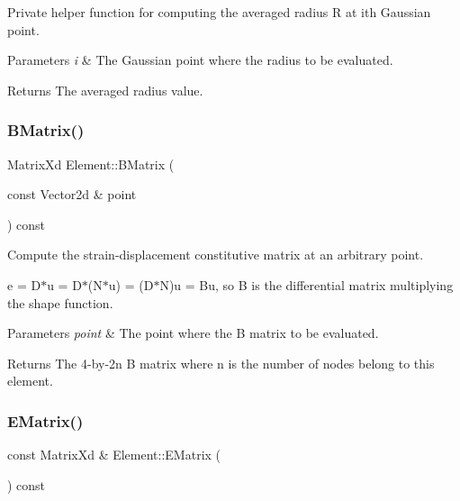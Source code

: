 Private helper function for computing the averaged radius R at ith Gaussian point. 


\begin{DoxyParams}{Parameters}
{\em i} & The Gaussian point where the radius to be evaluated. \\
\hline
\end{DoxyParams}
\begin{DoxyReturn}{Returns}
The averaged radius value. 
\end{DoxyReturn}
\mbox{\label{class_element_a19f8ba5c4c7569c3bcccf1b422a7dd89}} 
\subsubsection{\texorpdfstring{B\+Matrix()}{BMatrix()}}
{\footnotesize\ttfamily Matrix\+Xd Element\+::\+B\+Matrix (\begin{DoxyParamCaption}\item[{const Vector2d \&}]{point }\end{DoxyParamCaption}) const}



Compute the strain-\/displacement constitutive matrix at an arbitrary point. 

e = D$\ast$u = D$\ast$(N$\ast$u) = (D$\ast$N)u = Bu, so B is the differential matrix multiplying the shape function.


\begin{DoxyParams}{Parameters}
{\em point} & The point where the B matrix to be evaluated. \\
\hline
\end{DoxyParams}
\begin{DoxyReturn}{Returns}
The 4-\/by-\/2n B matrix where n is the number of nodes belong to this element. 
\end{DoxyReturn}
\mbox{\label{class_element_abd9d11d211f4f5e6f9e213a1013f36ed}} 
\subsubsection{\texorpdfstring{E\+Matrix()}{EMatrix()}}
{\footnotesize\ttfamily const Matrix\+Xd \& Element\+::\+E\+Matrix (\begin{DoxyParamCaption}{ }\end{DoxyParamCaption}) const}



